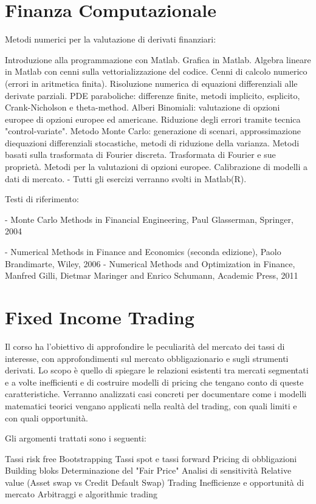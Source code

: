 \documentclass[a4paper,10pt]{article}
\begin{document}
\section{Finanza Computazionale}
Metodi numerici per la valutazione di derivati finanziari:

Introduzione alla programmazione con Matlab. Grafica in Matlab. Algebra lineare in Matlab con cenni sulla vettorializzazione del codice.
Cenni di calcolo numerico (errori in aritmetica finita).
Risoluzione numerica di equazioni differenziali alle derivate parziali. PDE paraboliche: differenze finite, metodi implicito, esplicito, Crank-Nicholson e theta-method.
Alberi Binomiali: valutazione di opzioni europee di opzioni europee ed americane. Riduzione degli errori tramite tecnica "control-variate".
Metodo Monte Carlo: generazione di scenari, approssimazione diequazioni differenziali stocastiche, metodi di riduzione della varianza.
Metodi basati sulla trasformata di Fourier discreta. Trasformata di Fourier e sue proprietà. Metodi per la valutazioni di opzioni europee.
Calibrazione di modelli a dati di mercato.
- Tutti gli esercizi verranno svolti in Matlab(R).


Testi di riferimento:

- Monte Carlo Methods in Financial Engineering, Paul Glasserman, Springer, 2004

- Numerical Methods in Finance and Economics (seconda edizione), Paolo Brandimarte, Wiley, 2006
- Numerical Methods and Optimization in Finance, Manfred Gilli, Dietmar Maringer and Enrico Schumann, Academic Press, 2011

\section{Fixed Income Trading}
Il corso ha l'obiettivo di approfondire le peculiarità del mercato dei tassi di interesse, con approfondimenti sul mercato obbligazionario e sugli strumenti derivati. Lo scopo è quello di spiegare le relazioni esistenti tra mercati segmentati e a volte inefficienti e di costruire modelli di pricing che tengano conto di queste caratteristiche. Verranno analizzati casi concreti per documentare come i modelli matematici teorici vengano applicati nella realtà del trading, con quali limiti e con quali opportunità.

Gli argomenti trattati sono i seguenti:

Tassi risk free
Bootstrapping
Tassi spot e tassi forward
Pricing di obbligazioni
Building bloks
Determinazione del "Fair Price"
Analisi di sensitività
Relative value (Asset swap vs Credit Default Swap)
Trading
Inefficienze e opportunità di mercato
Arbitraggi e algorithmic trading
\end{document}
